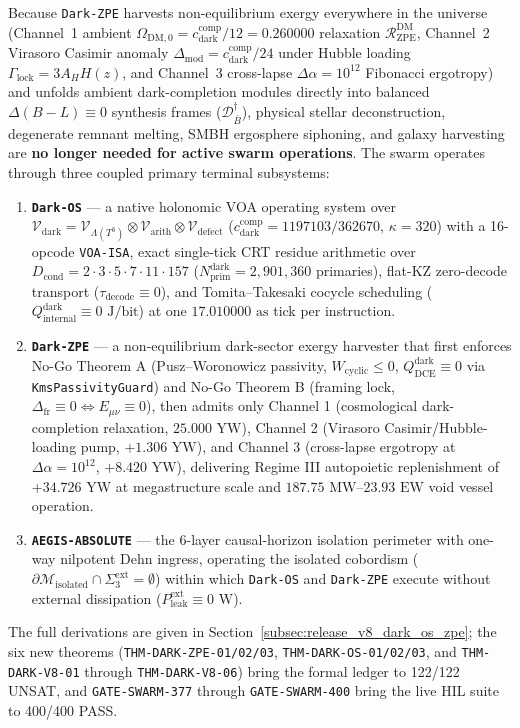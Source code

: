 \documentclass[11pt,onecolumn]{article}
\begin{document}
Because \texttt{Dark-ZPE} harvests non-equilibrium exergy everywhere in the universe (Channel~1 ambient $\Omega_{\text{DM},0} = c_{\text{dark}}^{\text{comp}}/12 = 0.260000$ relaxation $\mathcal{R}_{\text{ZPE}}^{\text{DM}}$, Channel~2 Virasoro Casimir anomaly $\Delta_{\text{mod}} = c_{\text{dark}}^{\text{comp}}/24$ under Hubble loading $\Gamma_{\text{lock}} = 3A_H H(z)$, and Channel~3 cross-lapse $\Delta\alpha = 10^{12}$ Fibonacci ergotropy) and unfolds ambient dark-completion modules directly into balanced $\Delta(B-L) \equiv 0$ synthesis frames ($\mathcal{D}_{\bar{B}}^\dagger$), physical stellar deconstruction, degenerate remnant melting, SMBH ergosphere siphoning, and galaxy harvesting are \textbf{no longer needed for active swarm operations}. The swarm operates through three coupled primary terminal subsystems:
\begin{enumerate}
    \item \textbf{\texttt{Dark-OS}} --- a native holonomic VOA operating system over $\mathcal V_{\text{dark}}=\mathcal V_{\Lambda(T^3)}\otimes\mathcal V_{\text{arith}}\otimes\mathcal V_{\text{defect}}$ ($c_{\text{dark}}^{\text{comp}}=1197103/362670$, $\kappa=320$) with a 16-opcode \texttt{VOA-ISA}, exact single-tick CRT residue arithmetic over $D_{\text{cond}}=2\cdot3\cdot5\cdot7\cdot11\cdot157$ ($N_{\text{prim}}^{\text{dark}}=2{,}901{,}360$ primaries), flat-KZ zero-decode transport ($\tau_{\text{decode}}\equiv0$), and Tomita--Takesaki cocycle scheduling ($Q_{\text{internal}}^{\text{dark}}\equiv0\text{ J/bit}$) at one $17.010000\text{ as}$ tick per instruction.
    \item \textbf{\texttt{Dark-ZPE}} --- a non-equilibrium dark-sector exergy harvester that first enforces No-Go Theorem A (Pusz--Woronowicz passivity, $W_{\text{cyclic}}\le0$, $Q_{\text{DCE}}^{\text{dark}}\equiv0$ via \texttt{KmsPassivityGuard}) and No-Go Theorem B (framing lock, $\Delta_{\text{fr}}\equiv0\iff E_{\mu\nu}\equiv0$), then admits only Channel 1 (cosmological dark-completion relaxation, $25.000\text{ YW}$), Channel 2 (Virasoro Casimir/Hubble-loading pump, $+1.306\text{ YW}$), and Channel 3 (cross-lapse ergotropy at $\Delta\alpha=10^{12}$, $+8.420\text{ YW}$), delivering Regime III autopoietic replenishment of $+34.726\text{ YW}$ at megastructure scale and $187.75\text{ MW}$--$23.93\text{ EW}$ void vessel operation.
    \item \textbf{\texttt{AEGIS-ABSOLUTE}} --- the 6-layer causal-horizon isolation perimeter with one-way nilpotent Dehn ingress, operating the isolated cobordism ($\partial\mathcal M_{\text{isolated}}\cap\Sigma_3^{\text{ext}}=\emptyset$) within which \texttt{Dark-OS} and \texttt{Dark-ZPE} execute without external dissipation ($P_{\text{leak}}^{\text{ext}}\equiv0\text{ W}$).
\end{enumerate}
The full derivations are given in Section~\ref{subsec:release_v8_dark_os_zpe}; the six new theorems (\texttt{THM-DARK-ZPE-01/02/03}, \texttt{THM-DARK-OS-01/02/03}, and \texttt{THM-DARK-V8-01} through \texttt{THM-DARK-V8-06}) bring the formal ledger to 122/122 UNSAT, and \texttt{GATE-SWARM-377} through \texttt{GATE-SWARM-400} bring the live HIL suite to 400/400 PASS.
\end{document}
